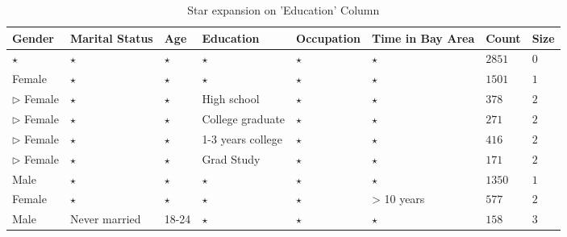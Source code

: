 \documentclass{sig-alternate}
\begin{document}
\begin{table*}
\centering 
\begin{tabular}{| p{1.5cm} | p{1.5cm} | p{1.5cm} | p{1.5cm} | p{1.5cm} | p{1.5cm} | l | l |} 
\hline Gender & Marital Status & Age & Education & Occupation & Time in Bay Area & Count & Size \\ \hline 
\cline{1-8} $\star$ & $\star$ & $\star$ & $\star$ & $\star$ & $\star$ & $2851$ & $0$ \\
\cline{1-1} \cline{2-2} \cline{3-3} \cline{4-4} \cline{5-5} \cline{6-6} \cline{7-8} Female & $\star$ & $\star$ & $\star$ & $\star$ & $\star$ & $1501$ & $1$ \\
\cline{2-2} \cline{3-3} \cline{4-4} \cline{5-5} \cline{6-6} \cline{7-8} $\triangleright$ Female & $\star$ & $\star$ & High school & $\star$ & $\star$ & $378$ & $2$ \\
\cline{2-2} \cline{3-3} \cline{4-4} \cline{5-5} \cline{6-6} \cline{7-8} $\triangleright$ Female & $\star$ & $\star$ & College graduate & $\star$ & $\star$ & $271$ & $2$ \\
\cline{2-2} \cline{3-3} \cline{4-4} \cline{5-5} \cline{6-6} \cline{7-8} $\triangleright$ Female & $\star$ & $\star$ & 1-3 years college & $\star$ & $\star$ & $416$ & $2$ \\
\cline{2-2} \cline{3-3} \cline{4-4} \cline{5-5} \cline{6-6} \cline{7-8} $\triangleright$ Female & $\star$ & $\star$ & Grad Study & $\star$ & $\star$ & $171$ & $2$ \\
\cline{1-1} \cline{2-2} \cline{3-3} \cline{4-4} \cline{5-5} \cline{6-6} \cline{7-8} Male & $\star$ & $\star$ & $\star$ & $\star$ & $\star$ & $1350$ & $1$ \\
\cline{1-1} \cline{2-2} \cline{3-3} \cline{4-4} \cline{5-5} \cline{6-6} \cline{7-8} Female & $\star$ & $\star$ & $\star$ & $\star$ & > 10 years & $577$ & $2$ \\
\cline{1-1} \cline{2-2} \cline{3-3} \cline{4-4} \cline{5-5} \cline{6-6} \cline{7-8} Male & Never married & 18-24 & $\star$ & $\star$ & $\star$ & $158$ & $3$ \\
\hline 
\end{tabular} 
\caption{Star expansion on 'Education' Column \label{table:uiexamplestar}} 
\end{table*} 
\end{document}
